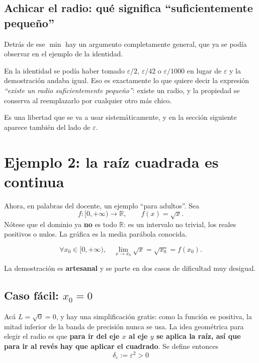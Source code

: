\documentclass[12pt,a4paper]{article}
\begin{document}
\subsection{Achicar el radio: qué significa ``suficientemente pequeño''}

Detrás de ese $\min$ hay un argumento completamente general, que ya se podía
observar en el ejemplo de la identidad.

\begin{keybox}
En la identidad se podía haber tomado $\varepsilon/2$, $\varepsilon/42$ o
$\varepsilon/1000$ en lugar de $\varepsilon$ y la demostración andaba igual.
Eso es exactamente lo que quiere decir la expresión \emph{``existe un radio
suficientemente pequeño''}: existe un radio, y la propiedad se conserva al
reemplazarlo por cualquier otro más chico.
\end{keybox}

Es una libertad que se va a usar sistemáticamente, y en la sección siguiente
aparece también del lado de $\varepsilon$.

\section{Ejemplo 2: la raíz cuadrada es continua}

Ahora, en palabras del docente, un ejemplo ``para adultos''. Sea
\[
  f : [0, +\infty) \to \mathbb{R}, \qquad f(x) = \sqrt{x}.
\]
Nótese que el dominio ya \textbf{no} es todo $\mathbb{R}$: es un intervalo no
trivial, los reales positivos o nulos. La gráfica es la media parábola
conocida.

\begin{keybox}
\[
  \forall x_0 \in [0,+\infty), \quad
  \lim_{x \to x_0}\sqrt{x} = \sqrt{x_0} = f(x_0).
\]
\end{keybox}

La demostración es \textbf{artesanal} y se parte en dos casos de dificultad muy
desigual.

\subsection{Caso fácil: $x_0 = 0$}

Acá $L = \sqrt{0} = 0$, y hay una simplificación gratis: como la función es
positiva, la mitad inferior de la banda de precisión nunca se usa. La idea
geométrica para elegir el radio es que \textbf{para ir del eje $x$ al eje $y$
se aplica la raíz, así que para ir al revés hay que aplicar el cuadrado}. Se
define entonces
\[
  \boxed{\delta_\varepsilon := \varepsilon^{2} > 0}
\]
\end{document}
